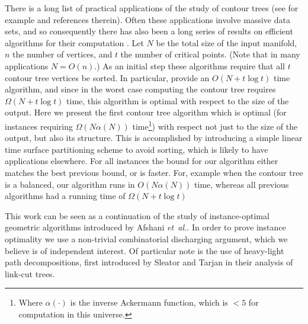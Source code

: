 \documentclass[11pt]{article}
\theoremstyle{definition}
\newcommand{\etal}{\textit{et~al.}\xspace}
\begin{document}
There is a long list of practical applications of the study of contour trees (see for example \cite{c-tmi-04} and references therein).
Often these applications involve massive data sets, and so consequently there has also been a long series 
of results on efficient algorithms for their computation \cite{kobps-ctsssit-97,tv-cct-98,csa-cctad-00,pc-ectls-02,cllr-sooscctmp-05}.
Let $N$ be the total size of the input manifold, $n$ the number of vertices, and $t$ the number of critical points. (Note that in many applications $N=O(n)$.)
As an initial step these algorithms require that all $t$ contour tree vertices be sorted.  
In particular, \cite{cllr-sooscctmp-05} provide an $O(N+t\log t)$ time algorithm, and since in the worst case computing the contour tree 
requires $\Omega(N+t\log t)$ time, this algorithm is optimal with respect to the size of the output.  
Here we present the first contour tree algorithm which is optimal (for instances requiring $\Omega(N\alpha(N))$ 
time\footnote{Where $\alpha(\cdot)$ is the inverse Ackermann function, which is $< 5$ for computation in this universe.}) 
with respect not just to the size of the output, but also its structure.  This is accomplished by introducing a simple linear time 
surface partitioning scheme to avoid sorting, which is likely to have applications elsewhere.  
For all instances the bound for our algorithm either matches the best previous bound, or is faster.
For, example when the contour tree is a balanced, our algorithm runs in $O(N\alpha(N))$ time, whereas all 
previous algorithms had a running time of $\Omega(N+t\log t)$


This work can be seen as a continuation of the study of instance-optimal geometric algorithms introduced by Afshani \etal \cite{abc-ioga-09}.
In order to prove instance optimality we use a non-trivial combinatorial discharging argument, which we believe is of independent interest.
Of particular note is the use of heavy-light path decompositions, first introduced by Sleator and Tarjan \cite{st-dsdt-83} in their analysis of link-cut trees.
\end{document}
